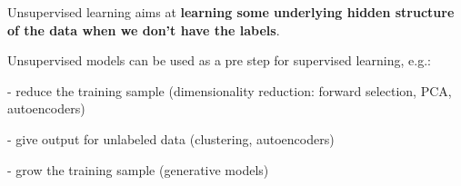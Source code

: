 Unsupervised learning aims at \textbf{learning some underlying hidden structure of the data when we don't have the labels}.

Unsupervised models can be used as a pre step for supervised learning, e.g.:

- reduce the training sample (dimensionality reduction: forward selection, PCA, autoencoders)

- give output for unlabeled data (clustering, autoencoders)

- grow the training sample (generative models)

\vspace{5mm}